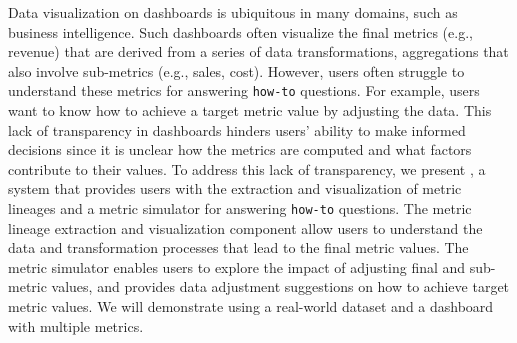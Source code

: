 
Data visualization on dashboards is ubiquitous in many domains, such as business
intelligence. Such dashboards often visualize the final metrics (e.g., revenue)
that are derived from a series of data transformations, aggregations that also
involve sub-metrics (e.g., sales, cost). However, users often struggle to
understand these metrics for answering \texttt{how-to} questions. For example,
users want to know how to achieve a target metric value by adjusting the data.
This lack of transparency in dashboards hinders users' ability to make informed
decisions since it is unclear how the metrics are computed and what factors
contribute to their values. To address this lack of transparency, we present
\clue, a system that provides users with the extraction and visualization of
metric lineages and a metric simulator for answering \texttt{how-to} questions.
The metric lineage extraction and visualization component allow users to
understand the data and transformation processes that lead to the final metric
values. The metric simulator enables users to explore the impact of adjusting
final and sub-metric values, and provides data adjustment suggestions on how to
achieve target metric values. We will demonstrate \clue using a real-world
dataset and a dashboard with multiple metrics. 